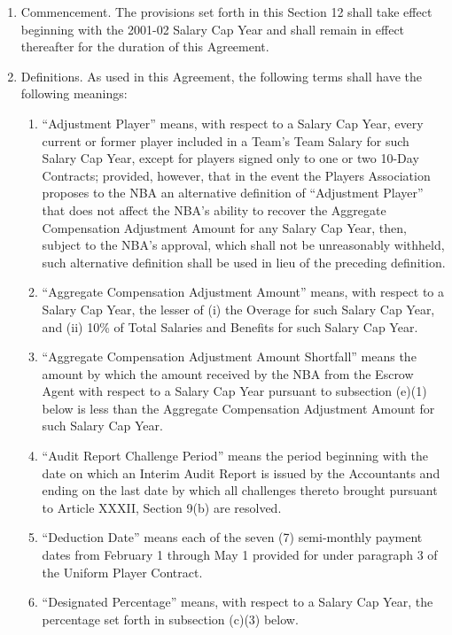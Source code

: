 \documentclass[
]{book}
\providecommand{\tightlist}{%
  \setlength{\itemsep}{0pt}\setlength{\parskip}{0pt}}
\begin{document}
\begin{enumerate}
\def\labelenumi{(\alph{enumi})}
\tightlist
\item
  Commencement. The provisions set forth in this Section 12 shall take effect beginning with the 2001-02 Salary Cap Year and shall remain in effect thereafter for the duration of this Agreement.
\item
  Definitions. As used in this Agreement, the following terms shall have the following meanings:

  \begin{enumerate}
  \def\labelenumii{(\arabic{enumii})}
  \item
    ``Adjustment Player'' means, with respect to a Salary Cap Year, every current or former player included in a Team's Team Salary for such Salary Cap Year, except for players signed only to one or two 10-Day Contracts; provided, however, that in the event the Players Association proposes to the NBA an alternative definition of ``Adjustment Player'' that does not affect the NBA's ability to recover the Aggregate Compensation Adjustment Amount for any Salary Cap Year, then, subject to the NBA's approval, which shall not be unreasonably withheld, such alternative definition shall be used in lieu of the preceding definition.
  \item
    ``Aggregate Compensation Adjustment Amount'' means, with respect to a Salary Cap Year, the lesser of (i) the Overage for such Salary Cap Year, and (ii) 10\% of Total Salaries and Benefits for such Salary Cap Year.
  \item
    ``Aggregate Compensation Adjustment Amount Shortfall'' means the amount by which the amount received by the NBA from the Escrow Agent with respect to a Salary Cap Year pursuant to subsection (e)(1) below is less than the Aggregate Compensation Adjustment Amount for such Salary Cap Year.
  \item
    ``Audit Report Challenge Period'' means the period beginning with the date on which an Interim Audit Report is issued by the Accountants and ending on the last date by which all challenges thereto brought pursuant to Article XXXII, Section 9(b) are resolved.
  \item
    ``Deduction Date'' means each of the seven (7) semi-monthly payment dates from February 1 through May 1 provided for under paragraph 3 of the Uniform Player Contract.
  \item
    ``Designated Percentage'' means, with respect to a Salary Cap Year, the percentage set forth in subsection (c)(3) below.

\end{enumerate}
\end{enumerate}
\end{document}
